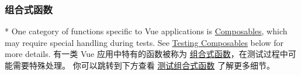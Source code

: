 \begin{paracol}{2}
\subsubsection{组合式函数}
\switchcolumn[0]*%
One category of functions specific to Vue applications is
\href{https://vuejs.org/guide/reusability/composables.html}{Composables},
which may require special handling during tests. See
\href{https://vuejs.org/guide/scaling-up/testing.html\#testing-composables}{Testing
Composables} below for more details.
\switchcolumn
有一类 Vue 应用中特有的函数被称为
\href{https://cn.vuejs.org/guide/reusability/composables.html}{组合式函数}，在测试过程中可能需要特殊处理。
你可以跳转到下方查看
\href{https://cn.vuejs.org/guide/scaling-up/testing.html\#testing-composables}{测试组合式函数}
了解更多细节。
\end{paracol}

